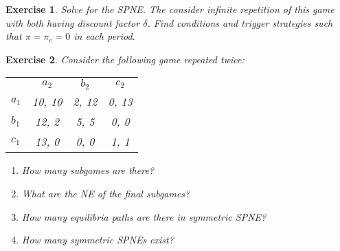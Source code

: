 \documentclass[letter, 10pt]{article}
\theoremstyle{basic}
\newtheorem{exercise}{Exercise}[]
\begin{document}
\begin{spacing}{1.0}
\begin{exercise}
 \vspace{1em}
 Solve for the SPNE. The consider infinite repetition of this game with both having
 discount factor $\delta$. Find conditions and trigger strategies such that $\pi =
 \pi_e = 0$ in each period.
\end{exercise}

\begin{exercise}
  Consider the following game repeated twice: 
  \begin{center}
    \begin{tabular}{rccc}
                                 & $a_2$ & $b_2$ & $c_2$  \\ \cline{2-4}
      \multicolumn{1}{l|}{$a_1$} & 10, 10 & 2, 12  & 0, 13 \\
      \multicolumn{1}{l|}{$b_1$} & 12, 2  & 5, 5   & 0, 0  \\
      \multicolumn{1}{l|}{$c_1$} & 13, 0  & 0, 0   & 1, 1  \\
    \end{tabular}
  \end{center}
  \begin{enumerate}
  \item How many subgames are there?
  \item What are the NE of the final subgames?
  \item How many equilibria paths are there in symmetric SPNE?
  \item How many symmetric SPNEs exist?
  \end{enumerate}
\end{exercise}


\end{spacing}
\end{document}
